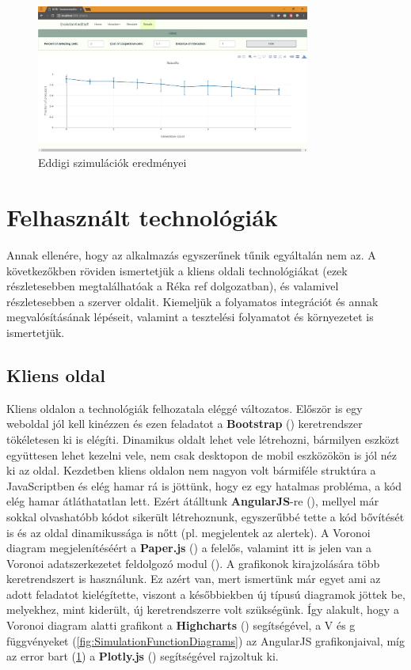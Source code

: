 \begin{figure}[ht!]
	\centering
	\includegraphics[width=90mm]{images/SimulationResults}
	\vspace*{1mm}
	\caption{Eddigi szimulációk eredményei}
	\label{fig:SimulationResults}
\end{figure}


\section{Felhasznált technológiák}

Annak ellenére, hogy az alkalmazás egyszerűnek tűnik egyáltalán nem az. A következőkben röviden ismertetjük a kliens oldali technológiákat (ezek részletesebben megtalálhatóak a {\color{red} Réka ref} dolgozatban), és valamivel részletesebben a szerver oldalit. Kiemeljük a folyamatos integrációt és annak megvalósításának lépéseit, valamint a tesztelési folyamatot és környezetet is ismertetjük.

\subsection{Kliens oldal}

Kliens oldalon a technológiák felhozatala eléggé változatos. Először is egy weboldal jól kell kinézzen és ezen feladatot a \textbf{Bootstrap} (\cite{soft:bootstrap}) keretrendszer tökéletesen ki is elégíti. Dinamikus oldalt lehet vele létrehozni, bármilyen eszközt együttesen lehet kezelni vele, nem csak desktopon de mobil eszközökön is jól néz ki az oldal. Kezdetben kliens oldalon nem nagyon volt bármiféle struktúra a JavaScriptben és elég hamar rá is jöttünk, hogy ez egy hatalmas probléma, a kód elég hamar átláthatatlan lett. Ezért átálltunk \textbf{AngularJS}-re (\cite{soft:angular}), mellyel már sokkal olvashatóbb kódot sikerült létrehoznunk, egyszerűbbé tette a kód bővítését is és az oldal dinamikussága is nőtt (pl. megjelentek az alertek). A Voronoi diagram megjelenítéséért a \textbf{Paper.js} (\cite{soft:paper}) a felelős, valamint itt is jelen van a Voronoi adatszerkezetet feldolgozó modul (\cite{soft:voronoiModule}). A grafikonok kirajzolására több keretrendszert is használunk. Ez azért van, mert ismertünk már egyet ami az adott feladatot kielégítette, viszont a későbbiekben új típusú diagramok jöttek be, melyekhez, mint kiderült, új keretrendszerre volt szükségünk. Így alakult, hogy a Voronoi diagram alatti grafikont a \textbf{Highcharts} (\cite{soft:highcharts}) segítségével, a V és g függvényeket (\ref{fig:SimulationFunctionDiagrams}) az AngularJS grafikonjaival, míg az error bart (\ref{fig:SimulationResults}) a \textbf{Plotly.js} (\cite{soft:plotly}) segítségével rajzoltuk ki.

